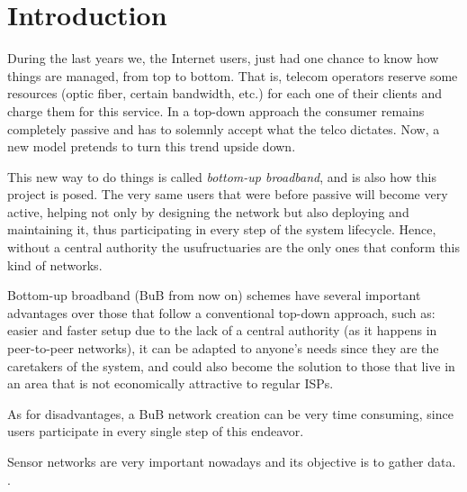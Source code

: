 
\chapter{Introduction} %

\label{Chapter1} %



During the last years we, the Internet users, just had one chance to know how things are managed, from top to bottom. That is, telecom operators reserve some resources (optic fiber, certain bandwidth, etc.) for each one of their clients and charge them for this service. In a top-down approach the consumer remains completely passive and has to solemnly accept what the telco dictates. Now, a new model pretends to turn this trend upside down.

This new way to do things is called \emph{bottom-up broadband}, and is also how this project is posed. The very same users that were before passive will become very active, helping not only by designing the network but also deploying and maintaining it, thus participating in every step of the system lifecycle. Hence, without a central authority the usufructuaries are the only ones that conform this kind of networks.

Bottom-up broadband (BuB from now on) schemes have several important advantages over those that follow a conventional top-down approach, such as: easier and faster setup due to the lack of a central authority (as it happens in peer-to-peer networks), it can be adapted to anyone's needs since they are the caretakers of the system, and could also become the solution to those that live in an area that is not economically attractive to regular ISPs\citep{}. %

As for disadvantages, a BuB network creation can be very time consuming, since users participate in every single step of this endeavor\citep{}. %

Sensor networks are very important nowadays and its objective is to gather data. 
\citep{}. %

